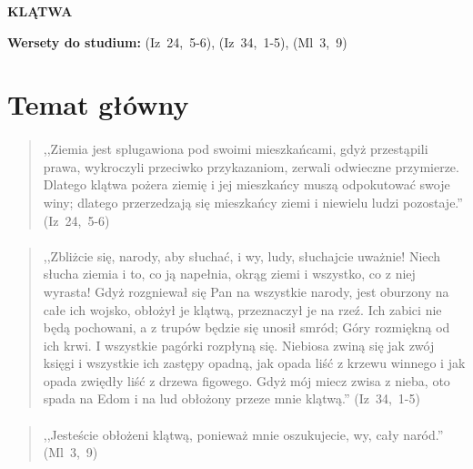 \documentclass[10pt,a4paper,oneside]{article}
\begin{document}
\centerline{\textbf{\MakeUppercase{Klątwa}}}
\begin{center}
\textbf{Wersety do studium:} 
\mbox{(Iz 24, 5-6)}, \mbox{(Iz 34, 1-5)}, \mbox{(Ml 3, 9)}
\end{center}
\section{Temat główny}
\paragraph{}
\begin{quote}
,,Ziemia jest splugawiona pod swoimi mieszkańcami, gdyż przestąpili prawa, wykroczyli przeciwko przykazaniom, zerwali odwieczne przymierze. Dlatego klątwa pożera ziemię i jej mieszkańcy muszą odpokutować swoje winy; dlatego przerzedzają się mieszkańcy ziemi i niewielu ludzi pozostaje.'' \mbox{(Iz 24, 5-6)}
\end{quote}
\paragraph{}
\begin{quote}
,,Zbliżcie się, narody, aby słuchać, i wy, ludy, słuchajcie uważnie! Niech słucha ziemia i to, co ją napełnia, okrąg ziemi i wszystko, co z niej wyrasta! Gdyż rozgniewał się Pan na wszystkie narody, jest oburzony na całe ich wojsko, obłożył je klątwą, przeznaczył je na rzeź. Ich zabici nie będą pochowani, a z trupów będzie się unosił smród; Góry rozmiękną od ich krwi. I wszystkie pagórki rozpłyną się. Niebiosa zwiną się jak zwój księgi i wszystkie ich zastępy opadną, jak opada liść z krzewu winnego i jak opada zwiędły liść z drzewa figowego. Gdyż mój miecz zwisa z nieba, oto spada na Edom i na lud obłożony przeze mnie klątwą.'' \mbox{(Iz 34, 1-5)}
\end{quote}
\paragraph{}
\begin{quote}
,,Jesteście obłożeni klątwą, ponieważ mnie oszukujecie, wy, cały naród.'' \mbox{(Ml 3, 9)}
\end{quote}
\end{document}
